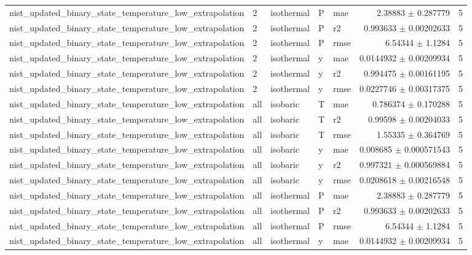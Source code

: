 \begin{tabular}{lllllrr}
nist\_updated\_binary\_state\_temperature\_low\_extrapolation & 2 & isothermal & P & mae & 2.38883 $\pm$ 0.287779 & 5 \\
nist\_updated\_binary\_state\_temperature\_low\_extrapolation & 2 & isothermal & P & r2 & 0.993633 $\pm$ 0.00202633 & 5 \\
nist\_updated\_binary\_state\_temperature\_low\_extrapolation & 2 & isothermal & P & rmse & 6.54344 $\pm$ 1.1284 & 5 \\
nist\_updated\_binary\_state\_temperature\_low\_extrapolation & 2 & isothermal & y & mae & 0.0144932 $\pm$ 0.00209934 & 5 \\
nist\_updated\_binary\_state\_temperature\_low\_extrapolation & 2 & isothermal & y & r2 & 0.994475 $\pm$ 0.00161195 & 5 \\
nist\_updated\_binary\_state\_temperature\_low\_extrapolation & 2 & isothermal & y & rmse & 0.0227746 $\pm$ 0.00317375 & 5 \\
nist\_updated\_binary\_state\_temperature\_low\_extrapolation & all & isobaric & T & mae & 0.786374 $\pm$ 0.170288 & 5 \\
nist\_updated\_binary\_state\_temperature\_low\_extrapolation & all & isobaric & T & r2 & 0.99598 $\pm$ 0.00204033 & 5 \\
nist\_updated\_binary\_state\_temperature\_low\_extrapolation & all & isobaric & T & rmse & 1.55335 $\pm$ 0.364769 & 5 \\
nist\_updated\_binary\_state\_temperature\_low\_extrapolation & all & isobaric & y & mae & 0.008685 $\pm$ 0.000571543 & 5 \\
nist\_updated\_binary\_state\_temperature\_low\_extrapolation & all & isobaric & y & r2 & 0.997321 $\pm$ 0.000569884 & 5 \\
nist\_updated\_binary\_state\_temperature\_low\_extrapolation & all & isobaric & y & rmse & 0.0208618 $\pm$ 0.00216548 & 5 \\
nist\_updated\_binary\_state\_temperature\_low\_extrapolation & all & isothermal & P & mae & 2.38883 $\pm$ 0.287779 & 5 \\
nist\_updated\_binary\_state\_temperature\_low\_extrapolation & all & isothermal & P & r2 & 0.993633 $\pm$ 0.00202633 & 5 \\
nist\_updated\_binary\_state\_temperature\_low\_extrapolation & all & isothermal & P & rmse & 6.54344 $\pm$ 1.1284 & 5 \\
nist\_updated\_binary\_state\_temperature\_low\_extrapolation & all & isothermal & y & mae & 0.0144932 $\pm$ 0.00209934 & 5 \\

\end{tabular}
